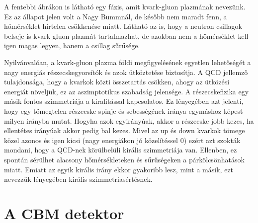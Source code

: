 \documentclass[a4paper,12pt]{article}
\begin{document}
\par A fentebbi ábrákon is látható egy fázis, amit kvark-gluon plazmának nevezünk. Ez az állapot jelen volt a Nagy Bummnál, de később
nem maradt fenn, a hőmérséklet hirtelen csökkenése miatt. Látható az is, hogy a neutron csillagok belseje is kvark-gluon plazmát tartalmazhat,
de azokban nem a hőmérséklet kell igen magas legyen, hanem a csillag sűrűsége. 
\vspace{5mm}
\par Nyilvánvalóan, a kvark-gluon plazma földi megfigyelésének egyetlen lehetőségét a nagy energiás részecskegyorsítók és azok
ütköztetése biztosítja. A QCD jellemző tulajdonsága, hogy a kvarkok közti összetartás csökken, ahogy az ütközési energiát
növeljük, ez az aszimptotikus szabadság jelensége. A részecskefizika egy másik fontos
szimmetriája a kiralitással kapcsolatos. Ez lényegében azt jelenti, hogy egy tömegtelen részecske spinje és sebességének iránya egymáshoz 
képest milyen irányba mutat. Hogyha azok egyirányúak, akkor a részecske jobb kezes, ha ellentétes irányúak akkor pedig bal kezes. Mivel
az up és down kvarkok tömege közel azonos és igen kicsi (nagy energiákon jó közelítéssel 0)
ezért azt szokták mondani, hogy a QCD-nek körülbelüli királis szimmetriája van. Ellenben, ez spontán
sérülhet alacsony hőmérsékleteken és sűrűségeken a párkölcsönhatások miatt. Emiatt az egyik királis irány ekkor 
gyakoribb lesz, mint a másik, ezt nevezzük lényegében királis szimmetriasértésnek. 
\section{ A CBM detektor}
\end{document}
